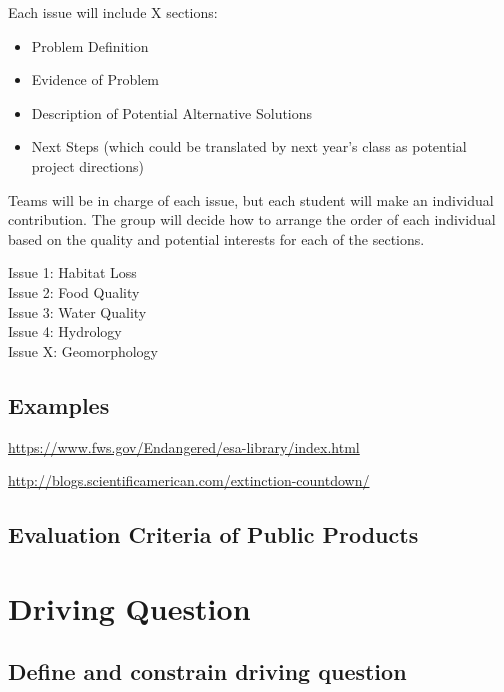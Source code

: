 \documentclass{article}\usepackage[]{graphicx}\usepackage[]{color}
\begin{document}
Each issue will include X sections:

\begin{itemize}
  \item Problem Definition
  \item Evidence of Problem
  \item Description of Potential Alternative Solutions
  \item Next Steps (which could be translated by next year's class as potential project directions)
\end{itemize}


Teams will be in charge of each issue, but each student will make an individual contribution. The group will decide how to arrange the order of each individual based on the quality and potential interests for each of the sections.  

\begin{description}
  \item[Issue 1: Habitat Loss] 
  \item[Issue 2: Food Quality] 
  \item[Issue 3: Water Quality]
  \item[Issue 4: Hydrology]
  \item[Issue X: Geomorphology]
\end{description}

\subsection{Examples}

\href{https://www.fws.gov/Endangered/esa-library/index.html}{https://www.fws.gov/Endangered/esa-library/index.html}

\href{http://blogs.scientificamerican.com/extinction-countdown/}{http://blogs.scientificamerican.com/extinction-countdown/}

\subsection{Evaluation Criteria of Public Products}

\section{Driving Question}

\subsection{Define and constrain driving question}
\end{document}
